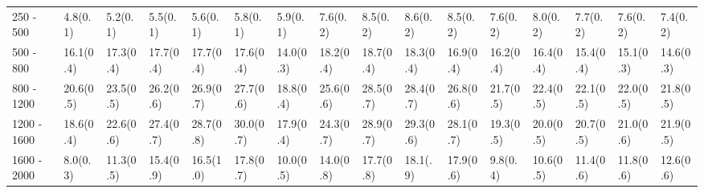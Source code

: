 \begin{table}
{\begin{tabular}{llllllllllllllll}
\multicolumn{1}{l||}{250 - 500}      & \multicolumn{1}{l|}{4.8(0.1)}         & \multicolumn{1}{l|}{5.2(0.1)}  & \multicolumn{1}{l|}{5.5(0.1)}        & \multicolumn{1}{l|}{5.6(0.1)}  				& \multicolumn{1}{l||}{5.8(0.1)}    & \multicolumn{1}{l|}{5.9(0.1)}         	& \multicolumn{1}{l|}{7.6(0.2)}  	& \multicolumn{1}{l|}{8.5(0.2)}  	& \multicolumn{1}{l|}{8.6(0.2)}  		        & \multicolumn{1}{l||}{8.5(0.2)}  							& \multicolumn{1}{l|}{7.6(0.2)}         & \multicolumn{1}{l|}{8.0(0.2)}  &   \multicolumn{1}{l|}{7.7(0.2)}  &   \multicolumn{1}{l|}{7.6(0.2)}  & \multicolumn{1}{l|}{7.4(0.2)}  \\
\multicolumn{1}{l||}{500 - 800}      & \multicolumn{1}{l|}{16.1(0.4)}        & \multicolumn{1}{l|}{17.3(0.4)} & \multicolumn{1}{l|}{17.7(0.4)} 	     & \multicolumn{1}{l|}{17.7(0.4)} 				& \multicolumn{1}{l||}{17.6(0.4)} 	& \multicolumn{1}{l|}{14.0(0.3)}        	& \multicolumn{1}{l|}{18.2(0.4)} 	& \multicolumn{1}{l|}{18.7(0.4)} 		& \multicolumn{1}{l|}{18.3(0.4)} 						& \multicolumn{1}{l||}{16.9(0.4)} 							& \multicolumn{1}{l|}{16.2(0.4)}        & \multicolumn{1}{l|}{16.4(0.4)} & 	 \multicolumn{1}{l|}{15.4(0.4)} & 	\multicolumn{1}{l|}{15.1(0.3)} & \multicolumn{1}{l|}{14.6(0.3)} \\
\multicolumn{1}{l||}{800 - 1200}     & \multicolumn{1}{l|}{20.6(0.5)}        & \multicolumn{1}{l|}{23.5(0.5)} & \multicolumn{1}{l|}{26.2(0.6)} 		 & \multicolumn{1}{l|}{26.9(0.7)} 				& \multicolumn{1}{l||}{27.7(0.6)} 	& \multicolumn{1}{l|}{18.8(0.4)}        	& \multicolumn{1}{l|}{25.6(0.6)} 	& \multicolumn{1}{l|}{28.5(0.7)} 		& \multicolumn{1}{l|}{28.4(0.7)} 						& \multicolumn{1}{l||}{26.8(0.6)} 							& \multicolumn{1}{l|}{21.7(0.5)}        & \multicolumn{1}{l|}{22.4(0.5)} & 	 \multicolumn{1}{l|}{22.1(0.5)} & 	\multicolumn{1}{l|}{22.0(0.5)} & \multicolumn{1}{l|}{21.8(0.5)} \\
\multicolumn{1}{l||}{1200 - 1600}    & \multicolumn{1}{l|}{18.6(0.4)}        & \multicolumn{1}{l|}{22.6(0.6)} & \multicolumn{1}{l|}{27.4(0.7)} 		 & \multicolumn{1}{l|}{28.7(0.8)} 				& \multicolumn{1}{l||}{30.0(0.7)} 	& \multicolumn{1}{l|}{17.9(0.4)}        	& \multicolumn{1}{l|}{24.3(0.7)} 	& \multicolumn{1}{l|}{28.9(0.7)} 						& \multicolumn{1}{l|}{29.3(0.6)} 		& \multicolumn{1}{l||}{28.1(0.7)} 							& \multicolumn{1}{l|}{19.3(0.5)}        & \multicolumn{1}{l|}{20.0(0.5)} & 	 \multicolumn{1}{l|}{20.7(0.5)} & 	\multicolumn{1}{l|}{21.0(0.6)} & \multicolumn{1}{l|}{21.9(0.5)} \\
\multicolumn{1}{l||}{1600 - 2000}    & \multicolumn{1}{l|}{8.0(0.3)}         & \multicolumn{1}{l|}{11.3(0.5)} & \multicolumn{1}{l|}{15.4(0.9)} 		 & \multicolumn{1}{l|}{16.5(1.0)} 				& \multicolumn{1}{l||}{17.8(0.7)} 	& \multicolumn{1}{l|}{10.0(0.5)}        	& \multicolumn{1}{l|}{14.0(0.8)} 	& \multicolumn{1}{l|}{17.7(0.8)} 						& \multicolumn{1}{l|}{18.1(.9)} 		& \multicolumn{1}{l||}{17.9(0.6)} 							& \multicolumn{1}{l|}{9.8(0.4)}         & \multicolumn{1}{l|}{10.6(0.5)} & 	 \multicolumn{1}{l|}{11.4(0.6)} & 	\multicolumn{1}{l|}{11.8(0.6)} & \multicolumn{1}{l|}{12.6(0.6)} \\ \hline

\end{tabular}}
\end{table}
